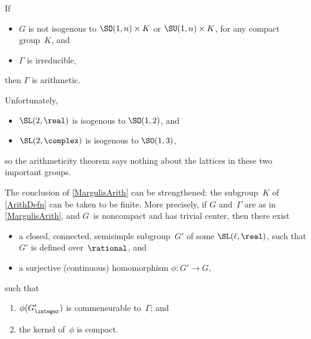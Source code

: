 \begin{thm}
\label{MargulisArith}
 If
 \begin{itemize}
 \item $G$ is not isogenous to\/ $\SO(1,n) \times K$ or\/
$\SU(1,n) \times K$, for any compact group~$K$, and
 \item $\Gamma$ is irreducible,
 \end{itemize}
 then $\Gamma$ is arithmetic.
 \end{thm}

\begin{warn}
 Unfortunately,
 \begin{itemize}
 \item $\SL(2,\real)$ is isogenous to $\SO(1,2)$, and 
 \item $\SL(2,\complex)$ is isogenous to $\SO(1,3)$,
 \end{itemize}
 so the arithmeticity theorem says nothing about the lattices in these two
important groups.
 \end{warn}

\begin{rem} \label{MargArithThmCpctFacts}
 The conclusion of \cref{MargulisArith} can be
strengthened: the subgroup~$K$ of \cref{ArithDefn} can
be taken to be finite. More precisely, if $G$ and~$\Gamma$
are as in \cref{MargulisArith}, and $G$~is noncompact
and has trivial center, then there exist
 \begin{itemize}
 \item a closed, connected, semisimple subgroup~$G'$ of
some $\SL(\ell,\real)$, such that $G'$ is defined
over~$\rational$, and
 \item a surjective (continuous) homomorphism $\phi \colon
G' \to G$, 
 \end{itemize}
 such that
 \begin{enumerate}
 \item $\phi( G'_{\integer} )$ is commensurable
to~$\Gamma$; and
 \item the kernel of~$\phi$ is compact.
 \end{enumerate}
 \end{rem}

